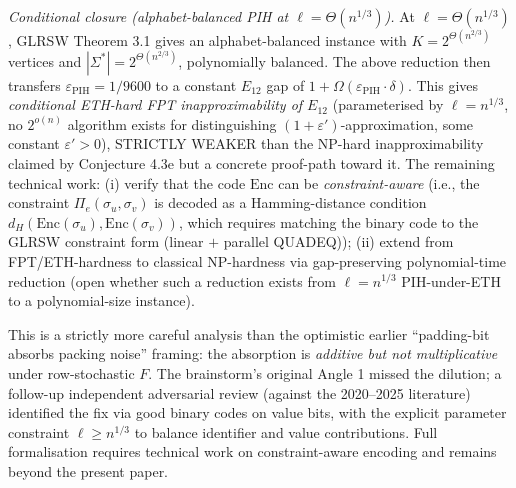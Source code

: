 \documentclass[
]{article}
\begin{document}
\begin{itemize}
  \emph{Conditional closure (alphabet-balanced PIH at $\ell = \Theta(n^{1/3})$).}
  At $\ell = \Theta(n^{1/3})$, GLRSW Theorem 3.1 gives an alphabet-balanced
  instance with $K = 2^{\Theta(n^{2/3})}$ vertices and $|\Sigma^*|
  = 2^{\Theta(n^{2/3})}$, polynomially balanced. The above reduction
  then transfers $\varepsilon_{\mathrm{PIH}} = 1/9600$ to a constant
  $E_{12}$ gap of $1 + \Omega(\varepsilon_{\mathrm{PIH}} \cdot \delta)$.
  This gives \emph{conditional ETH-hard FPT inapproximability of
  $E_{12}$} (parameterised by $\ell = n^{1/3}$, no $2^{o(n)}$ algorithm
  exists for distinguishing $(1+\varepsilon')$-approximation, some
  constant $\varepsilon' > 0$), STRICTLY WEAKER than the NP-hard
  inapproximability claimed by Conjecture 4.3e but a concrete proof-path
  toward it. The remaining technical work: (i) verify that the code
  $\mathrm{Enc}$ can be \emph{constraint-aware} (i.e., the constraint
  $\Pi_e(\sigma_u, \sigma_v)$ is decoded as a Hamming-distance condition
  $d_H(\mathrm{Enc}(\sigma_u), \mathrm{Enc}(\sigma_v))$, which requires
  matching the binary code to the GLRSW constraint form
  (linear $+$ parallel QUADEQ)); (ii) extend from FPT/ETH-hardness
  to classical NP-hardness via gap-preserving polynomial-time reduction
  (open whether such a reduction exists from $\ell = n^{1/3}$
  PIH-under-ETH to a polynomial-size instance).

  This is a strictly more careful analysis than the optimistic
  earlier ``padding-bit absorbs packing noise'' framing: the absorption
  is \emph{additive but not multiplicative} under row-stochastic $F$.
  The brainstorm's original Angle 1 missed the dilution; a
  follow-up independent adversarial review (against the 2020--2025
  literature) identified the fix via good
  binary codes on value bits, with the explicit parameter constraint
  $\ell \geq n^{1/3}$ to balance identifier and value contributions.
  Full formalisation requires technical work on constraint-aware
  encoding and remains beyond the present paper.


\end{itemize}
\end{document}
